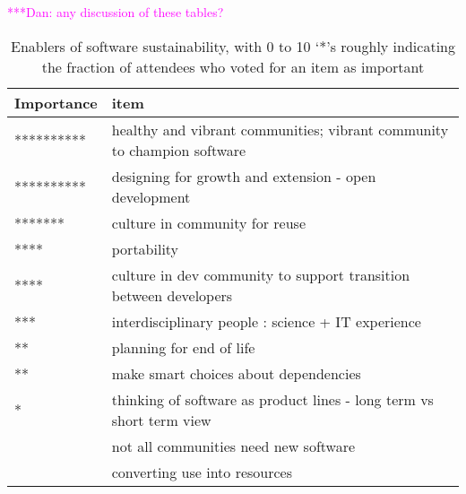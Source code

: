 \documentclass[11pt, oneside]{amsart}
\newcommand{\katznote}[1]{ {\textcolor{magenta}    { ***Dan:      #1 }}}
\begin{document}
\katznote{any discussion of these tables?}

\begin{table*}[ht]
\begin{center}
\caption{Enablers of software sustainability, with 0 to 10 `*'s roughly
indicating the fraction of attendees who voted for an item as important}
    \begin{scriptsize}
    \begin{tabular}{ | p{1.65cm} | p{10.0cm} |}
    \hline
  Importance & item \\ \hline \hline
********** & healthy and vibrant communities; vibrant community to champion software \\ \hline
********** & designing for growth and extension - open development \\ \hline
******* & culture in community for reuse \\ \hline
**** & portability \\ \hline
**** & culture in dev community to support transition between developers \\ \hline
*** & interdisciplinary people : science + IT experience \\ \hline
** & planning for end of life \\ \hline
** & make smart choices about dependencies \\ \hline
* & thinking of software as product lines - long term vs short term view \\ \hline
 & not all communities need new software \\ \hline
 & converting use into resources \\ \hline
    \end{tabular}
    \end{scriptsize}
    \label{tb:software_sustainability_enablers}
\end{center}   
\end{table*} 
\end{document}
